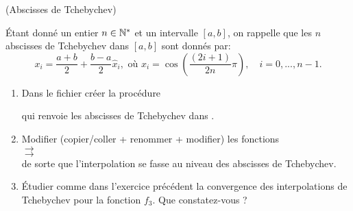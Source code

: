 \documentclass[a4paper,12pt,reqno]{amsart}
\begin{document}
\begin{exo} (Abscisses de Tchebychev)

  Étant donné un entier $n \in \mathbb{N}^*$ et un intervalle $[a,b]$, on rappelle que les $n$ abscisses de Tchebychev dans $[a,b]$ sont donnés par:
  $$
    x_i=\frac{a+b}{2}+\frac{b-a}{2} \hat{x}_i, \mbox{ où } \hat{x}_i=\cos\left(\displaystyle \frac{(2i+1)}{2n} \pi \right), \quad i=0,...,n-1.
  $$
  \begin{enumerate}

    \item Dans le fichier  créer la procédure
    \begin{center}
    \end{center}
    qui renvoie les  abscisses de Tchebychev dans \sclb{[a,b]}.

    \item Modifier (copier/coller + renommer + modifier) les fonctions\\
     $\longrightarrow$ \\
     $\longrightarrow$ \\
    de sorte que l'interpolation se fasse au niveau des abscisses de Tchebychev.

    \item Étudier comme dans l'exercice précédent la convergence des interpolations de Tchebychev pour la fonction $f_{3}$. Que constatez-vous ?
  \end{enumerate}
\end{exo}


\end{document}
